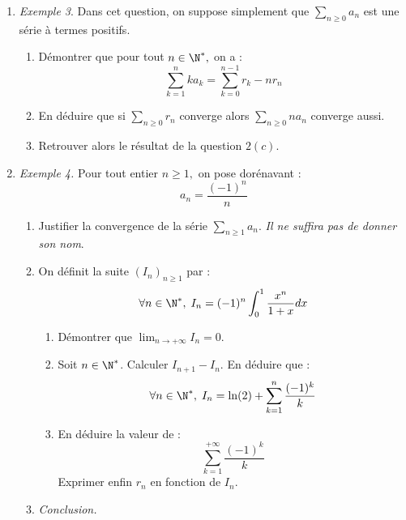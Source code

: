 \documentclass[twoside,french,11pt]{VcCours}
\begin{document}
\begin{enumerate}
  
  \item {\it Exemple 3}. Dans cet question, on suppose simplement que $\sum_{n \geq 0} a_n$ est une série à termes positifs.
  
  
  
  \begin{enumerate}
    \item Démontrer que pour tout $n\in\N^*,$ on a :
    $$\sum_{k=1}^n ka_k=\sum_{k=0}^{n-1} r_k-nr_n$$
    
    \item En déduire que si $\sum_{n \geq 0} r_n$ converge alors $\sum_{n \geq 0} na_n$ converge aussi.
    
    \item Retrouver alors le résultat de la question $2(c).$ 
    
  \end{enumerate}
  
  \item {\it Exemple 4.} Pour tout entier $n\geq 1,$ on pose dorénavant :
  $$a_n=\frac{(-1)^n}{n}$$
  
  \begin{enumerate}
  
  \item Justifier la convergence de la série $\sum_{n \geq 1} a_n.$ \textit{Il ne suffira pas de donner son nom}.
  
  
  \item On définit la suite $(I_n)_{n \geq 1}$ par :
  $$\forall n\in\N^*,\;
  I_n=(-1)^n\int_0^1\frac{x^n}{1+x}dx$$
  
  \begin{enumerate}
  
  \item Démontrer que 
  $\lim_{n\to +\infty}I_n=0.$
  
  
  \item Soit $n\in\N^*$. Calculer $I_{n+1}-I_n.$
  En déduire que :
  $$ \forall n\in\N^*, \; I_n=\ln(2)+\sum_{k=1}^n\frac{(-1)^k}{k}$$
  \item En déduire la valeur de :
  $$\sum_{k=1}^{+\infty}\frac{(-1)^k}{k}$$
  Exprimer enfin $r_n$ en fonction de $I_n.$
  
  
  
  \end{enumerate}
  
  \item \textit{Conclusion.}
  
  \begin{enumerate}
  

\end{enumerate}
\end{enumerate}
\end{enumerate}
\end{document}
